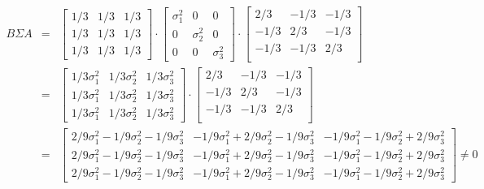 \documentclass[12pt,a4paper]{report}
\begin{document}
\begin{enumerate}
	\begin{eqnarray*}
	B\Sigma A&=&\begin{bmatrix}
	1/3 & 1/3 & 1/3\\
	1/3 & 1/3 & 1/3\\
	1/3 & 1/3 & 1/3
\end{bmatrix}	
\cdot 
\begin{bmatrix}
	\sigma^{2}_{1} & 0 & 0\\
	0 & \sigma^{2}_{2} & 0\\
	0 & 0 & \sigma^{2}_{3}
\end{bmatrix}
\cdot 
\begin{bmatrix}
	2/3 & -1/3 & -1/3\\
	-1/3 & 2/3 & -1/3\\
	-1/3 & -1/3 & 2/3\\
\end{bmatrix}\\
&=&\begin{bmatrix}
	1/3 \sigma_{1}^{2} & 1/3 \sigma_{2}^{2} & 1/3 \sigma_{3}^{2}\\
	1/3 \sigma_{1}^{2} & 1/3 \sigma_{2}^{2} & 1/3 \sigma_{3}^{2} \\
	1/3 \sigma_{1}^{2} & 1/3 \sigma_{2}^{2} & 1/3 \sigma_{3}^{2}
\end{bmatrix}	
\cdot 
\begin{bmatrix}
	2/3 & -1/3 & -1/3\\
	-1/3 & 2/3 & -1/3\\
	-1/3 & -1/3 & 2/3\\
\end{bmatrix}\\
&=& \begin{bmatrix}
	2/9 \sigma_{1}^{2} - 1/9 \sigma_{2}^{2} - 1/9 \sigma_{3}^{2}  & -1/9 \sigma_{1}^{2} + 2/9 \sigma_{2}^{2} - 1/9 \sigma_{3}^{2} & -1/9 \sigma_{1}^{2} - 1/9 \sigma_{2}^{2} + 2/9 \sigma_{3}^{2}\\
	2/9 \sigma_{1}^{2} - 1/9 \sigma_{2}^{2} - 1/9 \sigma_{3}^{2}  & -1/9 \sigma_{1}^{2} + 2/9 \sigma_{2}^{2} - 1/9 \sigma_{3}^{2} & -1/9 \sigma_{1}^{2} - 1/9 \sigma_{2}^{2} + 2/9 \sigma_{3}^{2} \\
	2/9 \sigma_{1}^{2} - 1/9 \sigma_{2}^{2} - 1/9 \sigma_{3}^{2}  & -1/9 \sigma_{1}^{2} + 2/9 \sigma_{2}^{2} - 1/9 \sigma_{3}^{2} & -1/9 \sigma_{1}^{2} - 1/9 \sigma_{2}^{2} + 2/9 \sigma_{3}^{2}
\end{bmatrix}\neq 0
	\end{eqnarray*}
\end{enumerate}


\end{document}

